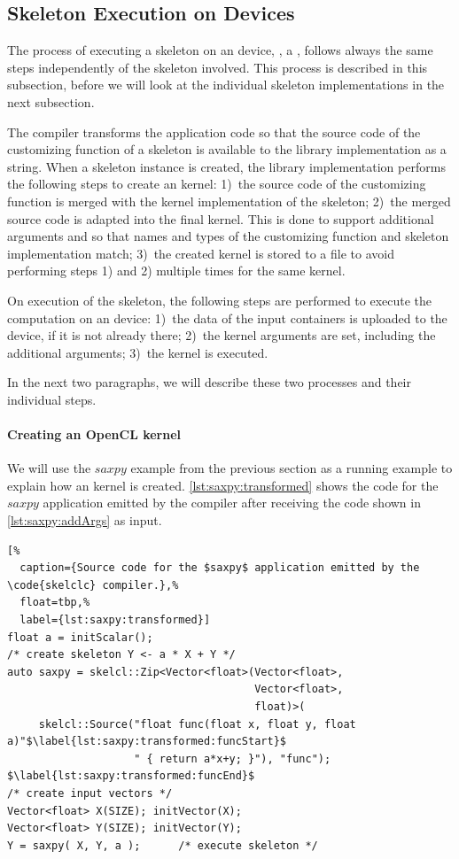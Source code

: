 \subsection{Skeleton Execution on \OpenCL Devices}
\label{section:skelcl-library:execution}
The process of executing a skeleton on an \OpenCL device, \eg, a \GPU, follows always the same steps independently of the skeleton involved.
This process is described in this subsection, before we will look at the individual skeleton implementations in the next subsection.

The  compiler transforms the \SkelCL application code so that the source code of the customizing function of a skeleton is available to the \SkelCL library implementation as a string.
When a skeleton instance is created, the \SkelCL library implementation performs the following steps to create an \OpenCL kernel:
1)~the source code of the customizing function is merged with the \OpenCL kernel implementation of the skeleton;
2)~the merged source code is adapted into the final \OpenCL kernel. This is done to support additional arguments and so that names and types of the customizing function and skeleton implementation match;
3)~the created \OpenCL kernel is stored to a file to avoid performing steps 1) and 2) multiple times for the same kernel.

On execution of the skeleton, the following steps are performed to execute the computation on an \OpenCL device:
1)~the data of the input containers is uploaded to the \OpenCL device, if it is not already there;
2)~the \OpenCL kernel arguments are set, including the additional arguments;
3)~the \OpenCL kernel is executed.

In the next two paragraphs, we will describe these two processes and their individual steps.

\paragraph{Creating an OpenCL kernel}
We will use the $saxpy$ example from the previous section as a running example to explain how an \OpenCL kernel is created.
\autoref{lst:saxpy:transformed} shows the code for the $saxpy$ application emitted by the  compiler after receiving the code shown in \autoref{lst:saxpy:addArgs} as input.
\begin{lstlisting}[%
  caption={Source code for the $saxpy$ application emitted by the \code{skelclc} compiler.},%
  float=tbp,%
  label={lst:saxpy:transformed}]
float a = initScalar();
/* create skeleton Y <- a * X + Y */
auto saxpy = skelcl::Zip<Vector<float>(Vector<float>,
                                       Vector<float>,
                                       float)>(
     skelcl::Source("float func(float x, float y, float a)"$\label{lst:saxpy:transformed:funcStart}$
                    " { return a*x+y; }"), "func"); $\label{lst:saxpy:transformed:funcEnd}$
/* create input vectors */
Vector<float> X(SIZE); initVector(X);
Vector<float> Y(SIZE); initVector(Y);
Y = saxpy( X, Y, a );      /* execute skeleton */
\end{lstlisting}

